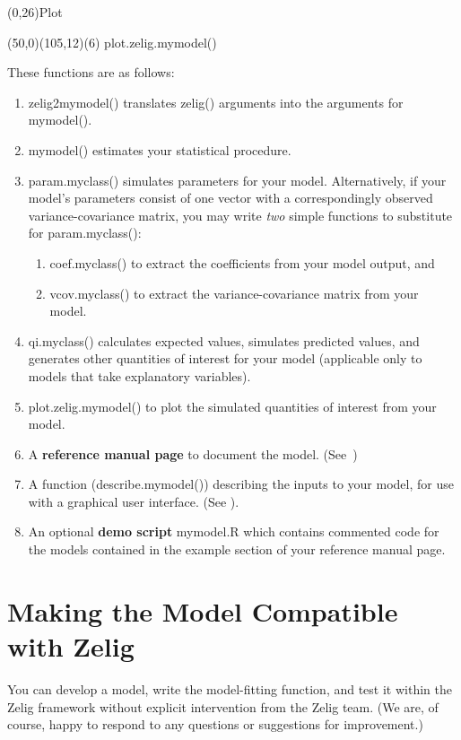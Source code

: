 \documentclass[letterpaper,10pt,english]{sphinxmanual}
\begin{document}
(0,26)Plot

(50,0)(105,12)(6) plot.zelig.mymodel()

These functions are as follows:
\begin{enumerate}
\item {} 
zelig2mymodel() translates zelig() arguments into the arguments for
mymodel().

\item {} 
mymodel() estimates your statistical procedure.

\item {} 
param.myclass() simulates parameters for your model. Alternatively,
if your model’s parameters consist of one vector with a
correspondingly observed variance-covariance matrix, you may write
\emph{two} simple functions to substitute for param.myclass():
\begin{enumerate}
\item {} 
coef.myclass() to extract the coefficients from your model output,
and

\item {} 
vcov.myclass() to extract the variance-covariance matrix from your
model.

\end{enumerate}

\item {} 
qi.myclass() calculates expected values, simulates predicted values,
and generates other quantities of interest for your model (applicable
only to models that take explanatory variables).

\item {} 
plot.zelig.mymodel() to plot the simulated quantities of interest
from your model.

\item {} 
A \textbf{reference manual page} to document the model. (See )

\item {} 
A function (describe.mymodel()) describing the inputs to your model,
for use with a graphical user interface. (See ).

\item {} 
An optional \textbf{demo script} mymodel.R which contains commented code
for the models contained in the example section of your reference
manual page.

\end{enumerate}


\section{Making the Model Compatible with Zelig}
\label{9_adding_models_and_methods:making-the-model-compatible-with-zelig}
You can develop a model, write the model-fitting function, and test it
within the Zelig framework without explicit intervention from the Zelig
team. (We are, of course, happy to respond to any questions or
suggestions for improvement.)
\end{document}
